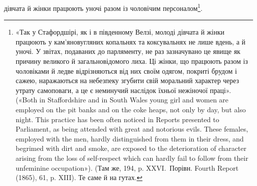 дівчата й жінки працюють уночі разом із чоловічим персоналом\footnote{
«Так у Стафордшірі, як і в південному Велзі, молоді дівчата й жінки
працюють у кам’яновугляних копальнях та коксувальнях не лише вдень,
а й уночі. У звітах, подаваних до парляменту, не раз зазначувано це
явище як причину великого й загальновідомого лиха. Ці жінки, що працюють
разом із чоловіками й ледве відрізняються від них своїм одягом,
покриті брудом і сажею, наражаються на небезпеку згубити свій моральний
характер через утрату самоповаги, а це є неминучий наслідок їхньої
нежіночої праці». («Both in Staffordshire and in South Wales young girl
and women are employed on the pit banks and on the coke heaps, not only
by day, but also night. This practice has been often noticed in Reports presented
to Parliament, as being attended with great and notorious evils.
These females, employed with the men, hardly distinguished from them
in their dress, and begrimed with dirt and smoke, are exposed to the deterioration
of character arising from the loss of self-respect which can hardly
fail to follow from their unfeminine occupation»). (Там же, 194, p. XXVI.~Порівн. Fourth Report (1865), 61, p. XIII). Те саме й на гутах.
}.
